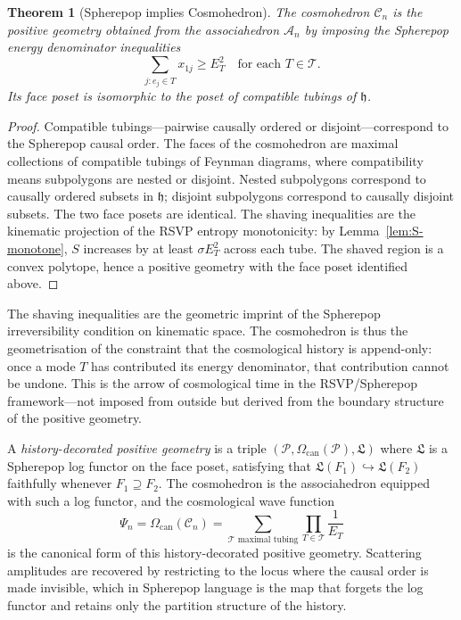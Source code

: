 \documentclass[11pt]{article}
\theoremstyle{plain}
\newtheorem{theorem}{Theorem}[section]
\theoremstyle{definition}
\theoremstyle{remark}
\newcommand{\Sf}{S}
\newcommand{\hist}{\mathfrak{h}}
\newcommand{\Log}{\mathfrak{L}}
\newcommand{\WF}{\Psi}
\newcommand{\Assoc}{\mathcal{A}_n}
\newcommand{\Cosmo}{\mathcal{C}_n}
\newcommand{\CF}{\Omega_{\mathrm{can}}}
\begin{document}
\begin{theorem}[Spherepop implies Cosmohedron]
\label{thm:cosmo}
The cosmohedron $\Cosmo$ is the positive geometry obtained from the associahedron $\Assoc$ by imposing the Spherepop energy denominator inequalities
\[
  \sum_{j: e_j \in T} x_{1j} \geq E_T^2 \quad \text{for each } T \in \mathcal{T}.
\]
Its face poset is isomorphic to the poset of compatible tubings of $\hist$.
\end{theorem}

\begin{proof}
Compatible tubings---pairwise causally ordered or disjoint---correspond to the Spherepop causal order. The faces of the cosmohedron are maximal collections of compatible tubings of Feynman diagrams, where compatibility means subpolygons are nested or disjoint. Nested subpolygons correspond to causally ordered subsets in $\hist$; disjoint subpolygons correspond to causally disjoint subsets. The two face posets are identical. The shaving inequalities are the kinematic projection of the RSVP entropy monotonicity: by Lemma~\ref{lem:S-monotone}, $\Sf$ increases by at least $\sigma E_T^2$ across each tube. The shaved region is a convex polytope, hence a positive geometry with the face poset identified above.
\end{proof}

The shaving inequalities are the geometric imprint of the Spherepop irreversibility condition on kinematic space. The cosmohedron is thus the geometrisation of the constraint that the cosmological history is append-only: once a mode $T$ has contributed its energy denominator, that contribution cannot be undone. This is the arrow of cosmological time in the RSVP/Spherepop framework---not imposed from outside but derived from the boundary structure of the positive geometry.

A \emph{history-decorated positive geometry} is a triple $(\mathcal{P}, \CF(\mathcal{P}), \Log)$ where $\Log$ is a Spherepop log functor on the face poset, satisfying that $\Log(F_1) \hookrightarrow \Log(F_2)$ faithfully whenever $F_1 \supseteq F_2$. The cosmohedron is the associahedron equipped with such a log functor, and the cosmological wave function
\[
  \WF_n = \CF(\Cosmo) = \sum_{\mathcal{T}\text{ maximal tubing}} \prod_{T \in \mathcal{T}} \frac{1}{E_T}
\]
is the canonical form of this history-decorated positive geometry. Scattering amplitudes are recovered by restricting to the locus where the causal order is made invisible, which in Spherepop language is the map that forgets the log functor and retains only the partition structure of the history.
\end{document}
